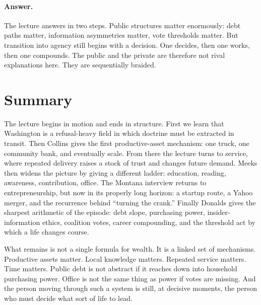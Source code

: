 \paragraph{Answer.} The lecture answers in two steps. Public structures matter enormously: debt paths matter, information asymmetries matter, vote thresholds matter. But transition into agency still begins with a decision. One decides, then one works, then one compounds. The public and the private are therefore not rival explanations here. They are sequentially braided.

\section{Summary}

The lecture begins in motion and ends in structure. First we learn that Washington is a refusal-heavy field in which doctrine must be extracted in transit. Then Collins gives the first productive-asset mechanism: one truck, one community bank, and eventually scale. From there the lecture turns to service, where repeated delivery raises a stock of trust and changes future demand. Meeks then widens the picture by giving a different ladder: education, reading, awareness, contribution, office. The Montana interview returns to entrepreneurship, but now in its properly long horizon: a startup route, a Yahoo merger, and the recurrence behind ``turning the crank.'' Finally Donalds gives the sharpest arithmetic of the episode: debt slope, purchasing power, insider-information ethics, coalition votes, career compounding, and the threshold act by which a life changes course.

What remains is not a single formula for wealth. It is a linked set of mechanisms. Productive assets matter. Local knowledge matters. Repeated service matters. Time matters. Public debt is not abstract if it reaches down into household purchasing power. Office is not the same thing as power if votes are missing. And the person moving through such a system is still, at decisive moments, the person who must decide what sort of life to lead.